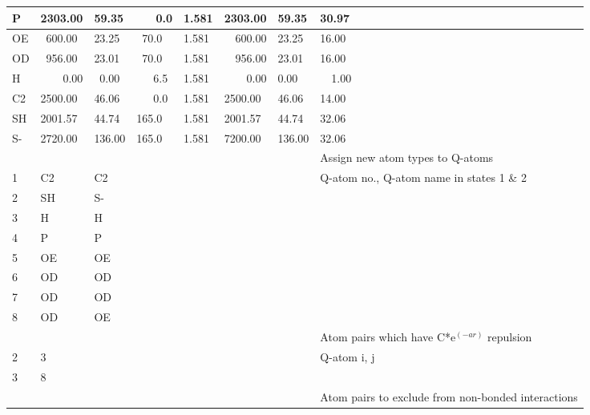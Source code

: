 \documentclass[a4paper,11pt]{article}
\begin{document}
\begin{longtable}{|p{35pt} p{35pt} p{35pt} p{35pt} p{35pt} p{35pt} p{35pt}| p{100pt}|}
  \hline P          & 2303.00 & 59.35  & ~~~0.0 & 1.581 & 2303.00 & \multicolumn{1}{l}{59.35}   & \multicolumn{1}{l|}{30.97} \\
  \hline OE         & ~600.00  & 23.25  & ~70.0 & 1.581 & \multicolumn{1}{r}{600.00}  & \multicolumn{1}{l}{23.25}   & \multicolumn{1}{l|}{16.00} \\
  \hline OD         & ~956.00  & 23.01  & ~70.0 & 1.581 & \multicolumn{1}{r}{956.00}  & \multicolumn{1}{l}{23.01}   & \multicolumn{1}{l|}{16.00} \\
  \hline H          & \multicolumn{1}{r}{0.00} & ~0.00  & ~~~6.5 & 1.581 & \multicolumn{1}{r}{0.00}  & \multicolumn{1}{l}{0.00}    & \multicolumn{1}{l|}{~~1.00} \\
  \hline C2         & 2500.00 & 46.06  & ~~~0.0 & 1.581 & 2500.00 & \multicolumn{1}{l}{46.06}   & \multicolumn{1}{l|}{14.00} \\
  \hline SH         & 2001.57 & 44.74  & 165.0 & 1.581 & 2001.57 & \multicolumn{1}{l}{44.74}   & \multicolumn{1}{l|}{32.06} \\
  \hline S-         & 2720.00 & 136.00 & 165.0 & 1.581 & 7200.00 & \multicolumn{1}{l}{136.00}  & \multicolumn{1}{l|}{32.06} \\
  \hline [change{\_}atoms] &      &  &  &  &  &  & Assign new atom types to Q-atoms \\
  \hline 1 & C2    & C2              &  &  &  &  & Q-atom no., Q-atom name in states 1 \& 2\\
  \hline 2 & SH    & S-              &  &  &  &  & \\
  \hline 3 & H     & H               &  &  &  &  & \\
  \hline 4 & P     & P               &  &  &  &  & \\
  \hline 5 & OE    & OE              &  &  &  &  & \\
  \hline 6 & OD    & OD              &  &  &  &  & \\
  \hline 7 & OD    & OD              &  &  &  &  & \\
  \hline 8 & OD    & OE              &  &  &  &  & \\
  \hline [soft{\_}pairs]   &      &  &  &  &  &  & Atom pairs which have C*e$^{(-ar)}$ repulsion \\
  \hline 2 & 3                    &  &  &  &  &  & Q-atom i, j \\
  \hline 3 & 8                    &  &  &  &  &  & \\
  \hline [excluded{\_}pairs] &    &  &  &  &  &  & Atom pairs to exclude from non-bonded interactions \\

\end{longtable}
\end{document}
